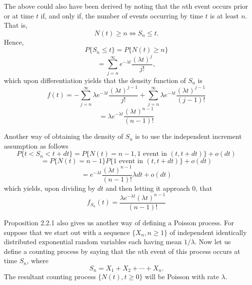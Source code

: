\documentclass[lang=cn,10pt,thmcnt=section]{elegantbook}
\begin{document}
The above could also have been derived by noting that the \( n \)th event occurs prior or at time \( t \) if, and only if, the number of events occurring by time \( t \) is at least \( n \). That is,
\[
N(t) \geq n \Leftrightarrow S_n \leq t.
\]
Hence,
\[
P\{S_n \leq t\} = P\{N(t) \geq n\}
\]
\[
= \sum_{j=n}^{\infty} e^{-\lambda t} \frac{(\lambda t)^j}{j!},
\]
which upon differentiation yields that the density function of \( S_n \) is
\[
f(t) = -\sum_{j=n}^{\infty} \lambda e^{-\lambda t} \frac{(\lambda t)^{j-1}}{j!} + \sum_{j=n}^{\infty} \lambda e^{-\lambda t} \frac{(\lambda t)^{j-1}}{(j-1)!}
\]
\[
= \lambda e^{-\lambda t} \frac{(\lambda t)^{n-1}}{(n-1)!}
\]
\begin{remark}
	Another way of obtaining the density of \( S_n \) is to use the independent increment assumption as follows
	\[
	P\{t < S_n < t + dt\} = P\{N(t) = n - 1, \text{1 event in } (t, t + dt)\} + o(dt)
	\]
	\[
	= P\{N(t) = n - 1\} P\{\text{1 event in } (t, t + dt)\} + o(dt)
	\]
	\[
	= e^{-\lambda t} \frac{(\lambda t)^{n-1}}{(n-1)!} \lambda dt + o(dt)
	\]
	which yields, upon dividing by \( dt \) and then letting it approach 0, that
	\[
	f_{S_n}(t) = \frac{\lambda e^{-\lambda t} (\lambda t)^{n-1}}{(n-1)!}
	\]
\end{remark}
Proposition 2.2.1 also gives us another way of defining a Poisson process. For suppose that we start out with a sequence \(\{X_n, n \geq 1\}\) of independent identically distributed exponential random variables each having mean \(1/\lambda\). Now let us define a counting process by saying that the \( n \)th event of this process occurs at time \( S_n \), where
\[
S_n = X_1 + X_2 + \cdots + X_n.
\]
The resultant counting process \(\{N(t), t \geq 0\}\) will be Poisson with rate \( \lambda \).
\end{document}
